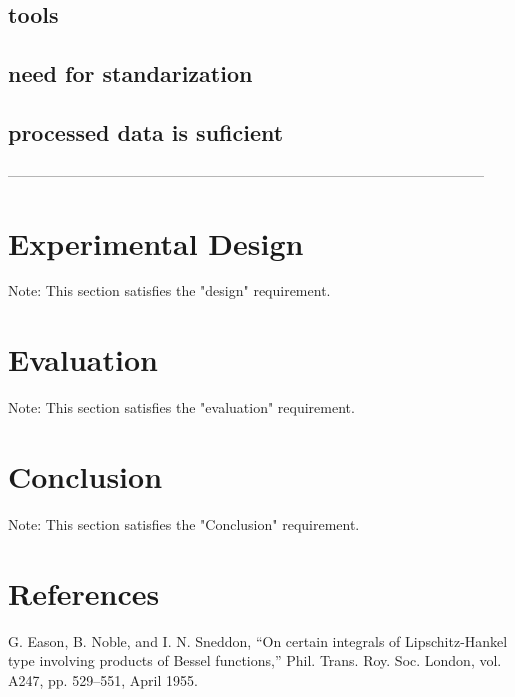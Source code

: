 \documentclass[conference]{IEEEtran}
\begin{document}
\subsection{tools}
\subsection{need for standarization}
\subsection{processed data is suficient}


------------------------------------------------------------------------------------------------------

\section{Experimental Design}


Note: This section satisfies the "design" requirement.

\section{Evaluation}
Note: This section satisfies the "evaluation" requirement.


\section{Conclusion}
Note: This section satisfies the "Conclusion" requirement.



\section*{References}
\begin{thebibliography}{00}
     G. Eason, B. Noble, and I. N. Sneddon, ``On certain integrals of Lipschitz-Hankel type involving products of Bessel functions,'' Phil. Trans. Roy. Soc. London, vol. A247, pp. 529--551, April 1955.
\end{thebibliography}
\end{document}
